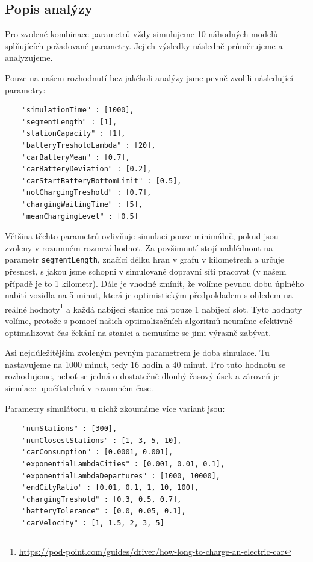 \subsection{Popis analýzy}

Pro zvolené kombinace parametrů vždy simulujeme 10 náhodných modelů splňujících
požadované parametry. Jejich výsledky následně průměrujeme a analyzujeme.

Pouze na našem rozhodnutí bez jakékoli analýzy jsme pevně zvolili následující
parametry:

\begin{Verbatim}
    "simulationTime" : [1000],
    "segmentLength" : [1],
    "stationCapacity" : [1],
    "batteryTresholdLambda" : [20],
    "carBatteryMean" : [0.7],
    "carBatteryDeviation" : [0.2],
    "carStartBatteryBottomLimit" : [0.5],
    "notChargingTreshold" : [0.7],
    "chargingWaitingTime" : [5],
    "meanChargingLevel" : [0.5]
\end{Verbatim}

Většina těchto parametrů ovlivňuje simulaci pouze minimálně, pokud jsou zvoleny v rozumném
rozmezí hodnot. Za povšimnutí stojí nahlédnout na parametr \texttt{segmentLength},
značící délku hran v grafu v kilometrech a určuje přesnost, s jakou jsme schopni
v simulované dopravní síti pracovat (v našem případě je to 1 kilometr). Dále je vhodné
zmínit, že volíme pevnou dobu úplného nabití vozidla na 5 minut, která
je optimistickým předpokladem s ohledem na reálné 
hodnoty\footnote{\url{https://pod-point.com/guides/driver/how-long-to-charge-an-electric-car}}
a každá nabíjecí stanice má pouze 1 nabíjecí slot. Tyto hodnoty volíme,
protože s pomocí našich optimalizačních algoritmů neumíme efektivně optimalizovat čas 
čekání na stanici a nemusíme se jimi výrazně zabývat.

Asi nejdůležitějším zvoleným pevným parametrem je doba simulace. Tu nastavujeme na
1000 minut, tedy 16 hodin a 40 minut. Pro tuto hodnotu se rozhodujeme, neboť se jedná
o dostatečně dlouhý časový úsek a zároveň je simulace upočítatelná v rozumném čase.

Parametry simulátoru, u nichž zkoumáme více variant jsou:

\begin{Verbatim}
    "numStations" : [300],
    "numClosestStations" : [1, 3, 5, 10], 
    "carConsumption" : [0.0001, 0.001],
    "exponentialLambdaCities" : [0.001, 0.01, 0.1],
    "exponentialLambdaDepartures" : [1000, 10000],
    "endCityRatio" : [0.01, 0.1, 1, 10, 100],
    "chargingTreshold" : [0.3, 0.5, 0.7],
    "batteryTolerance" : [0.0, 0.05, 0.1],
    "carVelocity" : [1, 1.5, 2, 3, 5]
\end{Verbatim}

